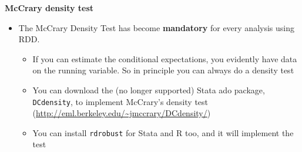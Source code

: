 \documentclass[notes=show]{beamer}
\begin{document}
\begin{frame}[plain]
\begin{center}
\textbf{McCrary density test}
\end{center}

\begin{itemize}
	\item The McCrary Density Test has become \textbf{mandatory} for every analysis using RDD. 
		\begin{itemize}
		\item If you can estimate the conditional expectations, you evidently have data on the running variable. So in principle you can always do a density test
		\item You can download the (no longer supported) Stata ado package, \texttt{DCdensity}, to implement McCrary's density test (\url{http://eml.berkeley.edu/~jmccrary/DCdensity/})
		\item You can install \texttt{rdrobust} for Stata and R too, and it will implement the test
		\end{itemize}
\end{itemize}

\end{frame}
\end{document}
